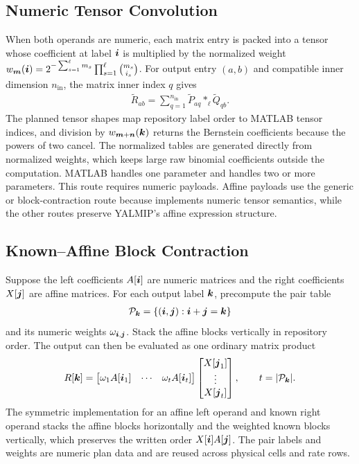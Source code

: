 \subsection{Numeric Tensor Convolution}

When both operands are numeric, each matrix entry is packed into a tensor whose coefficient at label $\boldsymbol{i}$ is multiplied by the normalized weight $w_{\boldsymbol{m}}(\boldsymbol{i})=2^{-\sum_{s=1}^{\ell} m_s}\prod_{s=1}^{\ell}\binom{m_s}{i_s}$. For output entry $(a,b)$ and compatible inner dimension $n_{\mathrm{in}}$, the matrix inner index $q$ gives
\begin{gather*}
\widetilde R_{ab}=\sum_{q=1}^{n_{\mathrm{in}}}\widetilde P_{aq}*_{\ell}\widetilde Q_{qb}.
\end{gather*}
The planned tensor shapes map repository label order to MATLAB tensor indices, and division by $w_{\boldsymbol{m}+\boldsymbol{n}}(\boldsymbol{k})$ returns the Bernstein coefficients because the powers of two cancel. The normalized tables are generated directly from normalized weights, which keeps large raw binomial coefficients outside the computation. MATLAB  handles one parameter and  handles two or more parameters. This route requires numeric payloads. Affine  payloads use the generic or block-contraction route because  implements numeric tensor semantics, while the other routes preserve YALMIP's affine expression structure.

\subsection{Known--Affine Block Contraction}

Suppose the left coefficients $A[\boldsymbol{i}]$ are numeric matrices and the right coefficients $X[\boldsymbol{j}]$ are affine  matrices. For each output label $\boldsymbol{k}$, precompute the pair table
\begin{gather*}
\mathcal P_{\boldsymbol{k}}=\{(\boldsymbol{i},\boldsymbol{j}):\boldsymbol{i}+\boldsymbol{j}=\boldsymbol{k}\}
\end{gather*}
and its numeric weights $\omega_{\boldsymbol{i},\boldsymbol{j}}$. Stack the affine blocks vertically in repository order. The output can then be evaluated as one ordinary matrix product
\begin{gather*}
R[\boldsymbol{k}]=
\begin{bmatrix}
\omega_1 A[\boldsymbol{i}_1]&\cdots&\omega_t A[\boldsymbol{i}_t]
\end{bmatrix}
\begin{bmatrix}
X[\boldsymbol{j}_1]\\ \vdots\\ X[\boldsymbol{j}_t]
\end{bmatrix},
\qquad t=|\mathcal P_{\boldsymbol{k}}|.
\end{gather*}
The symmetric implementation for an affine left operand and known right operand stacks the affine blocks horizontally and the weighted known blocks vertically, which preserves the written order $X[\boldsymbol{i}]A[\boldsymbol{j}]$. The pair labels and weights are numeric plan data and are reused across physical cells and rate rows.

